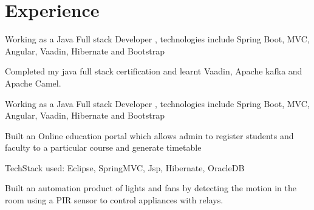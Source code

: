 \documentclass[]{deedy-resume-openfont}
\begin{document}
\begin{minipage}[t]{0.66\textwidth} 


\section{Experience}

\vspace{\topsep} %
\begin{tightemize}
\item Working as a Java Full stack Developer , technologies include Spring Boot, MVC, Angular, Vaadin, Hibernate and Bootstrap
\end{tightemize}

\vspace{\topsep} %

\begin{tightemize}
\item Completed my java full stack certification and learnt Vaadin, Apache kafka and Apache Camel.
\end{tightemize}

\vspace{\topsep} %

\begin{tightemize}
\item Working as a Java Full stack Developer , technologies include Spring Boot, MVC, Angular, Vaadin, Hibernate and Bootstrap
\item Built an Online education portal which allows admin to register students and faculty to a particular course and generate timetable
\item TechStack used:  Eclipse, SpringMVC, Jsp, Hibernate, OracleDB
\end{tightemize}
\sectionsep

\vspace{\topsep} %

\begin{tightemize}
\item Built an automation product of lights and fans by
detecting the motion in the room using a PIR sensor to control appliances with relays.
\end{tightemize}
\sectionsep


\end{minipage}
\end{document}
